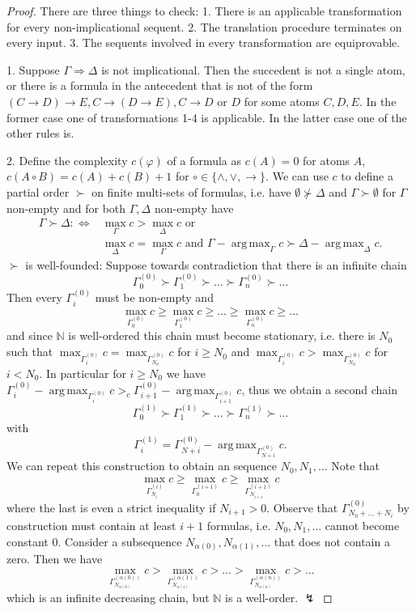 \documentclass[a4paper,12pt]{article}
\theoremstyle{definition}
\theoremstyle{definition}
\theoremstyle{definition}
\theoremstyle{definition}
\theoremstyle{definition}
\theoremstyle{definition}
\DeclareMathOperator*{\argmax}{arg\,max}
\begin{document}
	\begin{proof}[Proof]
		
		There are three things to check: 1. There is an applicable transformation for every non-implicational sequent. 2. The translation procedure terminates on every input. 3. The sequents involved in every transformation are equiprovable.
		
		1. Suppose $\Gamma\Rightarrow\Delta$ is not implicational. Then the succedent is not a single atom, or there is a formula in the antecedent that is not of the form $(C\to D)\to E, C\to (D\to E), C\to D$ or $D$ for some atoms $C, D, E$. In the former case one of transformations 1-4 is applicable. In the latter case one of the other rules is.

		2. Define the complexity $c(\varphi)$ of a formula as $c(A) = 0$ for atoms $A$, $c(A\circ B) = c(A) + c(B) + 1$ for $\circ\in\{\wedge,\vee,\to\}$. We can use $c$ to define a partial order $\succ$ on finite multi-sets of formulas, i.e. have $\emptyset\not \succ\Delta$ and $\Gamma\succ\emptyset$ for $\Gamma$ non-empty and for both $\Gamma,\Delta$ non-empty have\begin{align*}
			\Gamma \succ\Delta:\Longleftrightarrow&\max_\Gamma c > \max_\Delta c\text{ or }\\&\max_\Delta c =\max_\Gamma c\text{ and }\Gamma - \argmax_\Gamma c \succ\Delta - \argmax_\Delta c.
		\end{align*} $\succ$ is well-founded: Suppose towards contradiction that there is an infinite chain $$\Gamma_0^{(0)} \succ \Gamma_1^{(0)} \succ\dots\succ\Gamma_n^{(0)}\succ\dots$$Then every $\Gamma_i^{(0)}$ must be non-empty and $$\max_{\Gamma_0^{(0)}}c \geq \max_{\Gamma_1^{(0)}}c \geq\dots \geq \max_{\Gamma_n^{(0)}}c \geq\dots$$ and since $\mathbb{N}$ is well-ordered this chain must become stationary, i.e. there is $N_0$ such that $\max_{\Gamma_i^{(0)}}c = \max_{\Gamma_{N_0}^{(0)}}c$ for $i\geq N_0$ and $\max_{\Gamma_i^{(0)}}c>\max_{\Gamma_{N_0}^{(0)}}c$ for $i<N_0$. In particular for $i\geq N_0$ we have $\Gamma_i^{(0)}-\argmax_{\Gamma_i^{(0)}}c >_c \Gamma_{i+1}^{(0)}-\argmax_{\Gamma_{i+1}^{(0)}}c$, thus we obtain a second chain $$\Gamma_0^{(1)} \succ\Gamma_1^{(1)} \succ\dots\succ\Gamma_n^{(1)}\succ\dots$$ with $$\Gamma_i^{(1)} = \Gamma_{N+i}^{(0)} - \argmax_{\Gamma_{N+i}^{(0)}}c.$$We can repeat this construction to obtain an sequence $N_0, N_1,\dots$ Note that $$ \max_{\Gamma_{N_i}^{(i)}}c\geq \max_{\Gamma_{0}^{(i+1)}}c\geq \max_{\Gamma_{N_{i+1}}^{(i+1)}}c$$where the last is even a strict inequality if $N_{i+1} > 0$. Observe that $\Gamma_{N_0+\dots+N_i}^{(0)}$ by construction must contain at least $i+1$ formulas, i.e. $N_0,N_1,\dots$ cannot become constant 0. Consider a subsequence $N_{\alpha(0)},N_{\alpha(1)},\dots$ that does not contain a zero. Then we have $$\max_{\Gamma_{N_{\alpha(0)}}^{({\alpha(0)})}}c > \max_{\Gamma_{N_{\alpha(1)}}^{({\alpha(1)})}}c>\dots >\max_{\Gamma_{N_{\alpha(n)}}^{({\alpha(n)})}}c>\dots$$ which is an infinite decreasing chain, but $\mathbb{N}$ is a well-order. $\lightning$
	

\end{proof}
\end{document}
